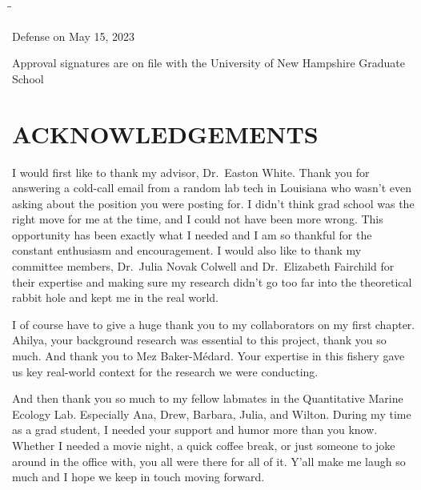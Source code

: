 \documentclass[
  12pt,
]{article}
\begin{document}
\begin{tabbing}

\hspace{30pt}\=\hspace{30pt}\=\kill

\> Defense on May 15, 2023

\end{tabbing}

\vspace{3 mm}

Approval signatures are on file with the University of New Hampshire Graduate School

\newpage
\setlength\parindent{24pt}

\hypertarget{acknowledgements}{%
\section{ACKNOWLEDGEMENTS}\label{acknowledgements}}

I would first like to thank my advisor, Dr.~Easton White. Thank you for answering a cold-call email from a random lab tech in Louisiana who wasn't even asking about the position you were posting for. I didn't think grad school was the right move for me at the time, and I could not have been more wrong. This opportunity has been exactly what I needed and I am so thankful for the constant enthusiasm and encouragement. I would also like to thank my committee members, Dr.~Julia Novak Colwell and Dr.~Elizabeth Fairchild for their expertise and making sure my research didn't go too far into the theoretical rabbit hole and kept me in the real world.

I of course have to give a huge thank you to my collaborators on my first chapter. Ahilya, your background research was essential to this project, thank you so much. And thank you to Mez Baker-Médard. Your expertise in this fishery gave us key real-world context for the research we were conducting.

And then thank you so much to my fellow labmates in the Quantitative Marine Ecology Lab. Especially Ana, Drew, Barbara, Julia, and Wilton. During my time as a grad student, I needed your support and humor more than you know. Whether I needed a movie night, a quick coffee break, or just someone to joke around in the office with, you all were there for all of it. Y'all make me laugh so much and I hope we keep in touch moving forward.
\end{document}
